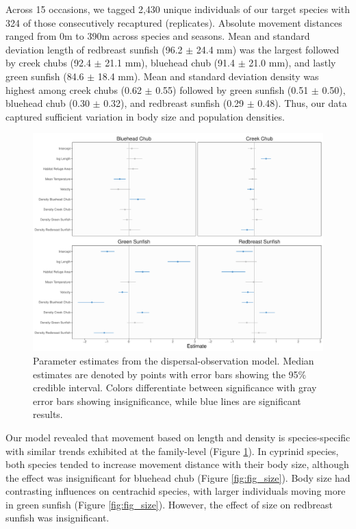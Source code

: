 \documentclass[11pt, class=article, crop=false]{standalone}
\begin{document}
Across 15 occasions, we tagged 2,430 unique individuals of our target species with 324 of those consecutively recaptured (replicates). Absolute movement distances ranged from 0m to 390m across species and seasons. Mean and standard deviation length of redbreast sunfish (96.2 $\pm$ 24.4 mm) was the largest followed by creek chubs (92.4 $\pm$ 21.1 mm), bluehead chub (91.4 $\pm$ 21.0 mm), and lastly green sunfish (84.6 $\pm$ 18.4 mm). Mean and standard deviation density was highest among creek chubs (0.62 $\pm$ 0.55) followed by green sunfish (0.51 $\pm$ 0.50), bluehead chub (0.30 $\pm$ 0.32), and redbreast sunfish (0.29 $\pm$ 0.48). Thus, our data captured sufficient variation in body size and population densities. 
\begin{figure}
    \centering
    \includegraphics[width=0.8\linewidth]{output/fig_est.pdf}
    \caption{Parameter estimates from the dispersal-observation model. Median estimates are denoted by points with error bars showing the 95\% credible interval. Colors differentiate between significance with gray error bars showing insignificance, while blue lines are significant results.}
    \label{fig:fig_est}
\end{figure}
Our model revealed that movement based on length and density is species-specific with similar trends exhibited at the family-level (Figure \ref{fig:fig_est}). In cyprinid species, both species tended to increase movement distance with their body size, although the effect was insignificant for bluehead chub (Figure \ref{fig:fig_size}). Body size had contrasting influences on centrachid species, with larger individuals moving more in green sunfish (Figure \ref{fig:fig_size}). However, the effect of size on redbreast sunfish was insignificant.
\end{document}
